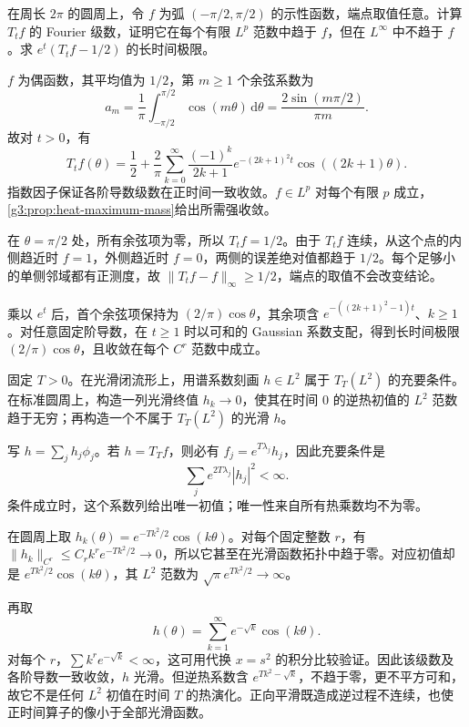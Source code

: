 \begin{exercise}\label{g3:ex:discontinuous-heat-initial-data}
	在周长 \(2\pi\) 的圆周上，令 \(f\) 为弧 \((-\pi/2,\pi/2)\) 的示性函数，端点取值任意。计算 \(T_tf\) 的 Fourier 级数，证明它在每个有限 \(L^p\) 范数中趋于 \(f\)，但在 \(L^\infty\) 中不趋于 \(f\)。求 \(e^t(T_tf-1/2)\) 的长时间极限。
\end{exercise}
\begin{solution}
	\(f\) 为偶函数，其平均值为 \(1/2\)，第 \(m\ge1\) 个余弦系数为
	\[
		a_m=\frac1\pi\int_{-\pi/2}^{\pi/2}\cos(m\theta)\,\mathrm d\theta
		=\frac{2\sin(m\pi/2)}{\pi m}.
	\]
	故对 \(t>0\)，有
	\[
		T_tf(\theta)=\frac12+\frac2\pi\sum_{k=0}^\infty
		\frac{(-1)^k}{2k+1}e^{-(2k+1)^2t}\cos((2k+1)\theta).
	\]
	指数因子保证各阶导数级数在正时间一致收敛。\(f\in L^p\) 对每个有限 \(p\) 成立，\cref{g3:prop:heat-maximum-mass}给出所需强收敛。

	在 \(\theta=\pi/2\) 处，所有余弦项为零，所以 \(T_tf=1/2\)。由于 \(T_tf\) 连续，从这个点的内侧趋近时 \(f=1\)，外侧趋近时 \(f=0\)，两侧的误差绝对值都趋于 \(1/2\)。每个足够小的单侧邻域都有正测度，故 \(\|T_tf-f\|_\infty\ge1/2\)，端点的取值不会改变结论。

	乘以 \(e^t\) 后，首个余弦项保持为 \((2/\pi)\cos\theta\)，其余项含 \(e^{-((2k+1)^2-1)t}\)、\(k\ge1\)。对任意固定阶导数，在 \(t\ge1\) 时以可和的 Gaussian 系数支配，得到长时间极限 \((2/\pi)\cos\theta\)，且收敛在每个 \(C^r\) 范数中成立。
\end{solution}

\begin{exercise}\label{g3:ex:backward-heat-instability}
	固定 \(T>0\)。在光滑闭流形上，用谱系数刻画 \(h\in L^2\) 属于 \(T_T(L^2)\) 的充要条件。在标准圆周上，构造一列光滑终值 \(h_k\to0\)，使其在时间 \(0\) 的逆热初值的 \(L^2\) 范数趋于无穷；再构造一个不属于 \(T_T(L^2)\) 的光滑 \(h\)。
\end{exercise}
\begin{solution}
	写 \(h=\sum_j h_j\phi_j\)。若 \(h=T_Tf\)，则必有 \(f_j=e^{T\lambda_j}h_j\)，因此充要条件是
	\[
		\sum_j e^{2T\lambda_j}|h_j|^2<\infty.
	\]
	条件成立时，这个系数列给出唯一初值；唯一性来自所有热乘数均不为零。

	在圆周上取 \(h_k(\theta)=e^{-Tk^2/2}\cos(k\theta)\)。对每个固定整数 \(r\)，有 \(\|h_k\|_{C^r}\le C_rk^r e^{-Tk^2/2}\to0\)，所以它甚至在光滑函数拓扑中趋于零。对应初值却是 \(e^{Tk^2/2}\cos(k\theta)\)，其 \(L^2\) 范数为 \(\sqrt\pi e^{Tk^2/2}\to\infty\)。

	再取
	\[
		h(\theta)=\sum_{k=1}^\infty e^{-\sqrt{k}}\cos(k\theta).
	\]
	对每个 \(r\)，\(\sum k^r e^{-\sqrt{k}}<\infty\)，这可用代换 \(x=s^2\) 的积分比较验证。因此该级数及各阶导数一致收敛，\(h\) 光滑。但逆热系数含 \(e^{Tk^2-\sqrt{k}}\)，不趋于零，更不平方可和，故它不是任何 \(L^2\) 初值在时间 \(T\) 的热演化。正向平滑既造成逆过程不连续，也使正时间算子的像小于全部光滑函数。
\end{solution}

